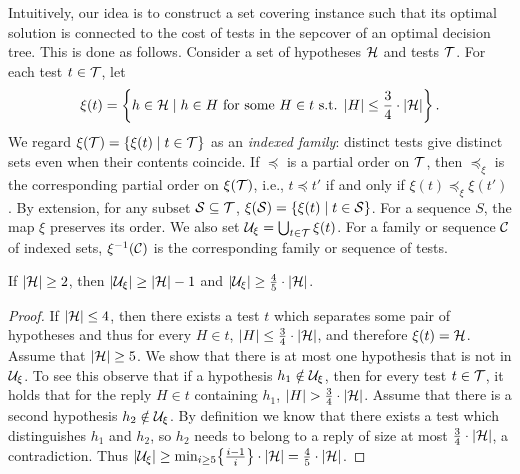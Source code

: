 % 

Intuitively, our idea is to construct a set covering instance such that its optimal solution is connected to the cost of tests in the sepcover of an optimal decision tree. This is done as follows.
Consider a set of hypotheses $\mathcal{H}$ and tests $\mathcal{T}$.
For each test $t\in\mathcal{T}$, let
\[
\xi(t)=\mathopen{}\left\{ h\in\mathcal{H} \mid h\in H \textup{ for some }H\in t\textup{ s.t. }  \mathopen{}\left| H \right|\leq\frac{3}{4}\cdot\mathopen{}\left| \mathcal{H} \right| \right\}.
\]
We regard $\xi\mathopen{}\left( \mathcal{T} \right)=\mathopen{}\left\{ \xi(t)\mid t\in\mathcal{T} \right\}$ as an \emph{indexed family}: distinct tests give distinct sets even when their contents coincide. If $\preceq$ is a partial order on $\mathcal{T}$, then $\preceq_{\xi}$ is the corresponding partial order on $\xi(\mathcal{T})$, i.e., $t\preceq t'$ if and only if $\xi(t)\preceq_{\xi}\xi(t')$.
By extension, for any subset $\mathcal{S}\subseteq\mathcal{T}$, $\xi(\mathcal{S})=\mathopen{}\left\{ \xi(t) \mid t\in \mathcal{S} \right\}$. For a sequence $S$, the map $\xi$ preserves its order.
We also set $\mathcal{U}_{\xi}=\bigcup_{t\in\mathcal{T}}\xi(t)$.
For a family or sequence $\mathcal{C}$ of indexed sets, $\xi^{-1}(\mathcal{C})$ is the corresponding family or sequence of tests.
\begin{lemma}
    If $\mathopen{}\left| \mathcal{H} \right|\geq2$, then $\mathopen{}\left| \mathcal{U}_{\xi} \right|\geq \mathopen{}\left| \mathcal{H} \right|-1$ and $\mathopen{}\left| \mathcal{U}_{\xi} \right|\geq \frac{4}{5}\cdot\mathopen{}\left| \mathcal{H} \right|$.
\end{lemma}
\begin{proof}
    If $\mathopen{}\left| \mathcal{H} \right|\leq4$, then there exists a test $t$ which separates some pair of hypotheses and thus for every $H\in t$, $\mathopen{}\left| H \right|\leq\frac{3}{4}\cdot\mathopen{}\left| \mathcal{H} \right|$, and therefore $\xi\mathopen{}\left( t \right)=\mathcal{H}$. Assume that $\mathopen{}\left| \mathcal{H} \right|\geq5$. We show that there is at most one hypothesis that is not in $\mathcal{U}_{\xi}$. To see this observe that if a hypothesis $h_1\notin \mathcal{U}_{\xi}$, then for every test $t\in\mathcal{T}$, it holds that for the reply $H\in t$ containing $h_1$, $\spr{H}>\frac{3}{4}\cdot\spr{\cH}$. Assume that there is a second hypothesis $h_2\notin \mathcal{U}_{\xi}$. By definition we know that there exists a test which distinguishes $h_1$ and $h_2$, so $h_2$ needs to belong to a reply of size at most $\frac{3}{4}\cdot\mathopen{}\left| \mathcal{H} \right|$, a contradiction. Thus $\mathopen{}\left| \mathcal{U}_{\xi} \right|\geq \min_{i\geq5}\mathopen{}\left\{ \frac{i-1}{i} \right\}\cdot\mathopen{}\left| \mathcal{H} \right|=\frac{4}{5}\cdot\mathopen{}\left| \mathcal{H} \right|$.
\end{proof}
 
